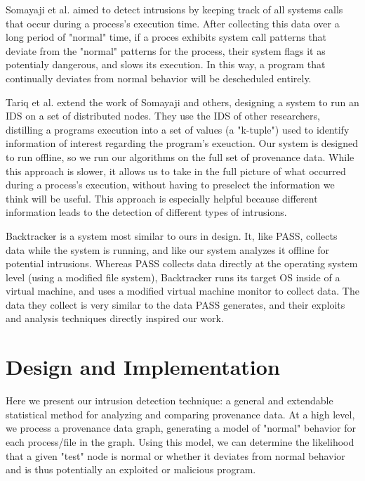 \documentclass[10pt,twocolumn]{article}
\begin{document}
Somayaji et al. \cite{somayaji} aimed to detect intrusions by keeping track of all systems calls that occur during a process's execution time. After collecting this data over a long period of "normal" time, if a proces exhibits system call patterns that deviate from the "normal" patterns for the process, their system flags it as potentialy dangerous, and slows its execution. In this way, a program that continually deviates from normal behavior will be descheduled entirely. 

Tariq et al. \cite{correlated-anomalies} extend the work of Somayaji and others, designing a system to run an IDS on a set of distributed nodes. They use the IDS of other researchers, distilling a programs execution into a set of values (a "k-tuple") used to identify information of interest regarding the program's exeuction. Our system is designed to run offline, so we run our algorithms on the full set of provenance data. While this approach is slower, it allows us to take in the full picture of what occurred during a process's execution, without having to preselect the information we think will be useful. This approach is especially helpful because different information leads to the detection of different types of intrusions.

Backtracker \cite{backtracker} is a system most similar to ours in design. It, like PASS, collects data while the system is running, and like our system analyzes it offline for potential intrusions. Whereas PASS collects data directly at the operating system level (using a modified file system), Backtracker runs its target OS inside of a virtual machine, and uses a modified virtual machine monitor to collect data. The data they collect is very similar to the data PASS generates, and their exploits and analysis techniques directly inspired our work. 
%

\section{Design and Implementation}
Here we present our intrusion detection technique: a general and extendable statistical method for analyzing and comparing provenance data. At a high level, we process a provenance data graph, generating a model of "normal" behavior for each process/file in the graph. Using this model, we can determine the likelihood that a given "test" node is normal or whether it deviates from normal behavior and is thus potentially an exploited or malicious program.
\end{document}

